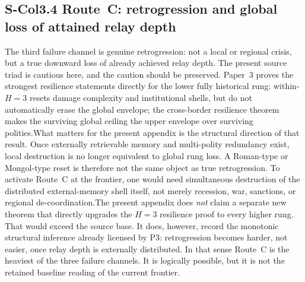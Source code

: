 \documentclass[11pt]{article}
\begin{document}
\subsection*{S-Col3.4 Route~C: retrogression and global loss of attained relay depth}
\label{sec:S-Col3.4}The third failure channel is genuine retrogression: not a local or regional crisis, but a true downward loss of already achieved relay depth. The present source triad is cautious here, and the caution should be preserved. Paper~3 proves the strongest resilience statements directly for the lower fully historical rung: within-$H{=}3$ resets damage complexity and institutional shells, but do not automatically erase the global envelope; the cross-border resilience theorem makes the surviving global ceiling the upper envelope over surviving polities.What matters for the present appendix is the structural direction of that result. Once externally retrievable memory and multi-polity redundancy exist, local destruction is no longer equivalent to global rung loss. A Roman-type or Mongol-type reset is therefore not the same object as true retrogression. To activate Route~C at the frontier, one would need simultaneous destruction of the distributed external-memory shell itself, not merely recession, war, sanctions, or regional de-coordination.The present appendix does \emph{not} claim a separate new theorem that directly upgrades the $H{=}3$ resilience proof to every higher rung. That would exceed the source base. It does, however, record the monotonic structural inference already licensed by P3: retrogression becomes harder, not easier, once relay depth is externally distributed. In that sense Route~C is the heaviest of the three failure channels. It is logically possible, but it is not the retained baseline reading of the current frontier.
\end{document}
